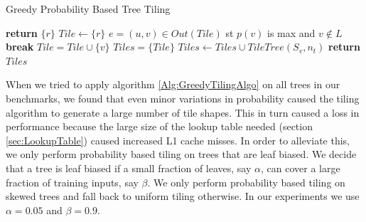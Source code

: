 
\begin{algorithm}
    \caption{Greedy Probability Based Tree Tiling}
    \label{Alg:GreedyTilingAlgo}
    \begin{algorithmic}
                \State \textbf{return} $\{ r \}$
            \EndIf
            \State $Tile \leftarrow \{ r \}$
                \State $e = (u,v) \in Out(Tile)$ st $p(v)$ is max and $v \notin L$
                    \State \textbf{break}
                \EndIf
                \State $Tile = Tile \cup \{ v \}$
            \EndWhile
            \State $Tiles =  \{ Tile \}$
                \State $Tiles \leftarrow Tiles \cup TileTree(S_v, n_t)$
            \EndFor
            \State \textbf{return} $Tiles$
        \EndProcedure
    \end{algorithmic}
\end{algorithm}

When we tried to apply algorithm \ref{Alg:GreedyTilingAlgo} on all trees in our benchmarks, we found
that even minor variations in probability caused the tiling algorithm to generate a large 
number of tile shapes. This in turn caused a loss in performance because the large size of the 
lookup table needed (section \ref{sec:LookupTable}) caused increased L1 cache misses. In order to 
alleviate this, we only perform probability based tiling on trees that are leaf biased. We decide that 
a tree is leaf biased if a small fraction of leaves, say $\alpha$, can cover a large fraction of training inputs, say $\beta$.
We only perform probability based tiling on skewed trees and fall back to uniform tiling otherwise. 
In our experiments we use $\alpha=0.05$ and $\beta=0.9$. 


